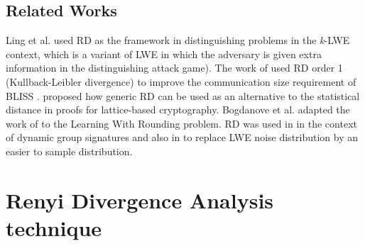 \subsection{Related Works}
\label{sec:renyiRelatedWorks}
Ling et al. \cite{ling2017hardness} used RD as the framework in distinguishing
problems in the \textit{k}-LWE context, which is a variant of LWE in which the
adversary is given extra information in the distinguishing attack game). The
work of \cite{poppelmann2014enhanced27} used RD order 1 (Kullback-Leibler
divergence) to improve the communication size requirement of BLISS
\cite{ducas2013lattice11}. \cite{bai2015improved5} proposed how generic RD can
be used as an alternative to the statistical distance in proofs for
lattice-based cryptography.  Bogdanove et al. \cite{bogdanov2016hardness4}
adapted the work of \cite{bai2015improved5} to the Learning With Rounding
problem. RD was used in \cite{libert2016signature} in the context of dynamic
group signatures and also in \cite{alkim2016post} to replace LWE noise
distribution by an easier to sample distribution.


\section{Renyi Divergence Analysis technique}
\label{sec:secProcRenyi}

